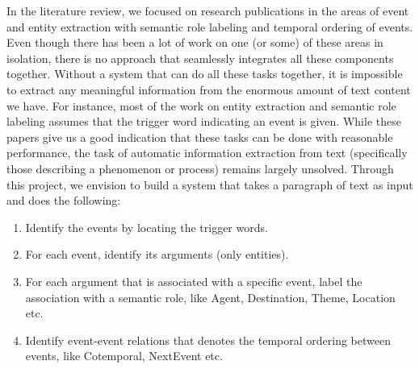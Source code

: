 In the literature review, we focused on research publications in the areas of event and entity extraction with semantic role labeling and temporal ordering of events. Even though there has been a lot of work on one (or some) of these areas in isolation, there is no approach that seamlessly integrates all these components together. Without a system that can do all these tasks together, it is impossible to extract any meaningful information from the enormous amount of text content we have. For instance, most of the work on entity extraction and semantic role labeling assumes that the trigger word indicating an event is given. While these papers give us a good indication that these tasks can be done with reasonable performance, the task of automatic information extraction from text (specifically those describing a phenomenon or process) remains largely unsolved. Through this project, we envision to build a system that takes a paragraph of text as input and does the following:

\begin{enumerate}
\item Identify the events by locating the trigger words.
\item For each event, identify its arguments (only entities).
\item For each argument that is associated with a specific event, label the association with a semantic role, like Agent, Destination, Theme, Location etc.
\item Identify event-event relations that denotes the temporal ordering between events, like Cotemporal, NextEvent etc.
\end{enumerate}